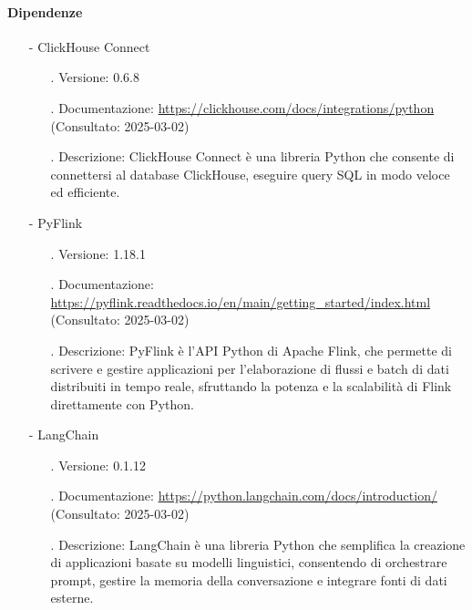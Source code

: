 \documentclass[10pt]{article}
\begin{document}
\begin{justify}
        \paragraph{Dipendenze}
            \begin{itemize}
                \item[-] ClickHouse Connect
                    \begin{itemize}
                        \item[.] Versione: 0.6.8
                        \item[.] Documentazione: \textcolor{blue}{\url{https://clickhouse.com/docs/integrations/python}} (Consultato: 2025-03-02)
                        \item[.] Descrizione: ClickHouse Connect è una libreria Python che consente di connettersi al database ClickHouse, eseguire query SQL 
                        in modo veloce ed efficiente.
                    \end{itemize}
                \item[-] PyFlink
                    \begin{itemize}
                        \item[.] Versione: 1.18.1
                        \item[.] Documentazione: \textcolor{blue}{\url{https://pyflink.readthedocs.io/en/main/getting_started/index.html}} (Consultato: 2025-03-02)
                        \item[.] Descrizione: PyFlink è l’API Python di Apache Flink, che permette di scrivere e gestire applicazioni per l'elaborazione di 
                        flussi e batch di dati distribuiti in tempo reale, sfruttando la potenza e la scalabilità di Flink direttamente con Python.
                    \end{itemize}
                \item[-] LangChain
                    \begin{itemize}
                        \item[.] Versione: 0.1.12
                        \item[.] Documentazione: \textcolor{blue}{\url{https://python.langchain.com/docs/introduction/}} (Consultato: 2025-03-02)
                        \item[.] Descrizione: LangChain è una libreria Python che semplifica la creazione di applicazioni basate su modelli linguistici, 
                        consentendo di orchestrare prompt, gestire la memoria della conversazione e integrare fonti di dati esterne.

\end{itemize}
\end{itemize}
\end{justify}
\end{document}
